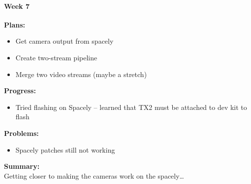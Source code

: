 \paragraph{Week 7}
\begin{adjustwidth}{2.5em}{0pt}
    \vspace{-0.5cm}\textbf{Plans:}
    \vspace{-0.5cm}
    \begin{itemize}
        \item Get camera output from spacely
        \item Create two-stream pipeline
        \item Merge two video streams (maybe a stretch)
    \end{itemize} 
    \vspace{-0.3cm}\textbf{Progress:}
    \vspace{-0.5cm}
    \begin{itemize}
        \item Tried flashing on Spacely -- learned that TX2 must be attached to dev kit to flash
    \end{itemize} 
    \vspace{-0.3cm}\textbf{Problems:}
    \vspace{-0.5cm}
    \begin{itemize}
        \item Spacely patches still not working
    \end{itemize}  
    \vspace{-0.3cm}\noindent\textbf{Summary:}\\
    \noindent 
    Getting closer to making the cameras work on the spacely…
\end{adjustwidth}

